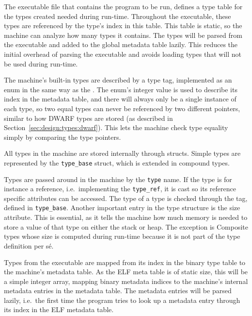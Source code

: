 The executable file that contains the program to be run, defines a type table
for the types created needed during run-time. Throughout the executable, these
types are referenced by the type's index in this table. This table is static, so
the machine can analyze how many types it contains. The types will be parsed
from the executable and added to the global metadata table lazily. This reduces
the initial overhead of parsing the executable and avoids loading types that
will not be used during run-time.

The machine's built-in types are described by a type tag, implemented as an enum
in the same way as the . The enum's integer value is used to
describe its index in the metadata table, and there will always only be a single
instance of each type, so two equal types can never be referenced by two
different pointers, similar to how DWARF types are stored (as described in
Section~\ref{sec:design:types:dwarf}). This lets the machine check type equality
simply by comparing the type pointers.

All types in the machine are stored internally through structs. Simple types are
represented by the {\tt type\_base} struct, which is extended in compound
types.

Types are passed around in the machine by the {\tt type} name. If the type is
for instance a reference, i.e.~implementing the {\tt type\_ref}, it is cast so
its reference specific attributes can be accessed. The type of a type is checked
through the tag, defined in {\tt type\_base}. Another important entry in the
type structure is the size attribute. This is essential, as it tells the machine
how much memory is needed to store a value of that type on either the stack or
heap. The exception is Composite types whose size is computed during run-time
because it is not part of the type definition per s\'e.

Types from the executable are mapped from its index in the binary type table to
the machine's metadata table. As the ELF meta table is of static size, this will
be a simple integer array, mapping binary metadata indices to the machine's
internal metadata entries in the metadata table. The metadata entries will be
parsed lazily, i.e.~the first time the program tries to look up a metadata entry
through its index in the ELF metadata table.

